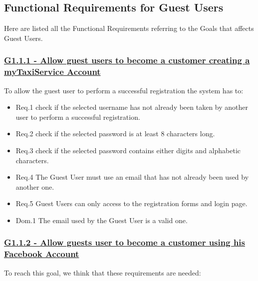 \documentclass{report}
\begin{document}
		\subsection{Functional Requirements for Guest Users}
		Here are listed all the Functional Requirements referring to the Goals that affects Guest Users.

			\subsubsection{\lbrack \hyperref[sec:g1_1_1]{G1.1.1 - Allow guest users to become a customer creating a myTaxiService Account}\rbrack}
			To allow the guest user to perform a successful registration the system has to:

				\begin{itemize}
					\item \lbrack Req.1\rbrack \label{sec:fr1_g1_1_1} check if the selected username has not already been taken by another user to perform a successful registration.
					\item \lbrack Req.2\rbrack \label{sec:fr2_g1_1_1} check if the selected password is at least 8 characters long.
					\item \lbrack Req.3\rbrack \label{sec:fr3_g1_1_1} check if the selected password contains either digits and alphabetic characters.
					\item \lbrack Req.4\rbrack \label{sec:fr4_g1_1_1} The Guest User must use an email that has not already been used by another one.
					\item \lbrack Req.5\rbrack \label{sec:fr5_g1_1_1} Guest Users can only access to the registration forms and login page.
					\item \lbrack Dom.1\rbrack \label{sec:da1_g1_1_1} The email used by the Guest User is a valid one.
				\end{itemize}

			\subsubsection{\lbrack \hyperref[sec:g1_1_2]{G1.1.2 - Allow guests user to become a customer using his Facebook Account}\rbrack}
			To reach this goal, we think that these requirements are needed:
\end{document}

